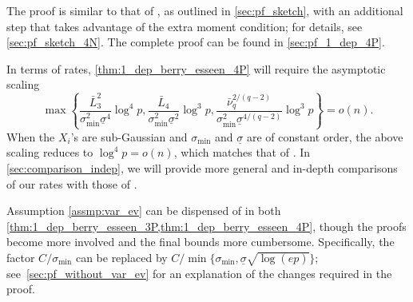 \documentclass[aos]{imsart}
\begin{document}
The proof is similar to that of , as outlined in \cref{sec:pf_sketch}, with an additional step that takes advantage of the extra moment condition; for details, see \cref{sec:pf_sketch_4N}. The complete proof can be found in \cref{sec:pf_1_dep_4P}.

In terms of rates, \cref{thm:1_dep_berry_esseen_4P} will require the  asymptotic scaling
$$\max\left\{ \frac{\bar{L}_3^2}{\sigma_{\min}^2 \underline{\sigma}^4} \log^4 p, \frac{\bar{L}_4}{\sigma_{\min}^2 \underline{\sigma}^2} \log^3 p, \frac{\bar{\nu}_q^{2/(q-2)}}{\sigma_{\min}^2 \underline{\sigma}^{4/(q-2)}} \log^{3} p \right\} = o(n).$$ 
When the $X_i$'s are sub-Gaussian and $\sigma_{\min}$ and $\underline{\sigma}$ are of constant order, the above scaling reduces to $\log^4 p = o(n)$, which matches that of . In \cref{sec:comparison_indep}, we will provide more general and in-depth comparisons of our rates with those of .


\begin{remark} \label{rmk:var_ev}
   Assumption \eqref{assmp:var_ev} can be dispensed of in both \cref{thm:1_dep_berry_esseen_3P,thm:1_dep_berry_esseen_4P}, though the proofs become more involved and the final bounds more cumbersome. Specifically, the factor ${C}/{\sigma_{\min}}$ can be replaced by $C/\min\{ \sigma_{\min}, \underline{\sigma} \sqrt{\log(ep)}\}$; see~\cref{sec:pf_without_var_ev} for an explanation of the changes required in the proof.
\end{remark}
\end{document}
